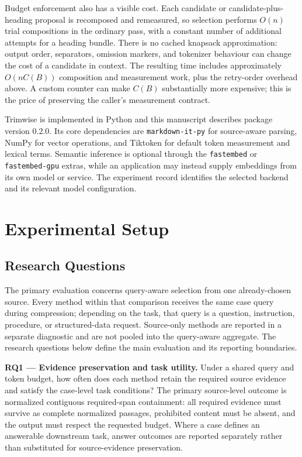 \documentclass[
]{article}
\begin{document}
Budget enforcement also has a visible cost. Each candidate or
candidate-plus-heading proposal is recomposed and remeasured, so
selection performs \(O(n)\) trial compositions in the ordinary pass,
with a constant number of additional attempts for a heading bundle.
There is no cached knapsack approximation: output order, separators,
omission markers, and tokenizer behaviour can change the cost of a
candidate in context. The resulting time includes approximately
\(O(nC(B))\) composition and measurement work, plus the retry-order
overhead above. A custom counter can make \(C(B)\) substantially more
expensive; this is the price of preserving the caller's measurement
contract.

Trimwise is implemented in Python and this manuscript describes package
version 0.2.0. Its core dependencies are \texttt{markdown-it-py} for
source-aware parsing, NumPy for vector operations, and Tiktoken for
default token measurement and lexical terms. Semantic inference is
optional through the \texttt{fastembed} or \texttt{fastembed-gpu}
extras, while an application may instead supply embeddings from its own
model or service. The experiment record identifies the selected backend
and its relevant model configuration.

\section{Experimental Setup}\label{experimental-setup}

\subsection{Research Questions}\label{research-questions}

The primary evaluation concerns query-aware selection from one
already-chosen source. Every method within that comparison receives the
same case query during compression; depending on the task, that query is
a question, instruction, procedure, or structured-data request.
Source-only methods are reported in a separate diagnostic and are not
pooled into the query-aware aggregate. The research questions below
define the main evaluation and its reporting boundaries.

\textbf{RQ1 --- Evidence preservation and task utility.} Under a shared
query and token budget, how often does each method retain the required
source evidence and satisfy the case-level task conditions? The primary
source-level outcome is normalized contiguous required-span containment:
all required evidence must survive as complete normalized passages,
prohibited content must be absent, and the output must respect the
requested budget. Where a case defines an answerable downstream task,
answer outcomes are reported separately rather than substituted for
source-evidence preservation.
\end{document}
